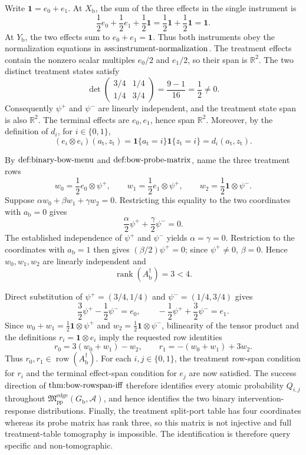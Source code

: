 Write \(\mathbf 1=e_0+e_1\).  At \(X_{\mathrm b}\), the sum of the three effects in the single instrument is
\[
 \frac12e_0+\frac12e_1+\frac12\mathbf 1
 =\frac12\mathbf 1+\frac12\mathbf 1
 =\mathbf 1.
\]
At \(Y_{\mathrm b}\), the two effects sum to \(e_0+e_1=\mathbf 1\).  Thus both instruments obey the normalization equations in \(\textnormal{ass:instrument-normalization}\).  The treatment effects contain the nonzero scalar multiples \(e_0/2\) and \(e_1/2\), so their span is \(\mathbb R^2\).  The two distinct treatment states satisfy
\[
 \det\!\begin{pmatrix}3/4&1/4\\[2pt]1/4&3/4\end{pmatrix}
 =\frac{9-1}{16}=\frac12\ne0.
\]
Consequently \(\psi^+\) and \(\psi^-\) are linearly independent, and the treatment state span is also \(\mathbb R^2\).  The terminal effects are \(e_0,e_1\), hence span \(\mathbb R^2\).  Moreover, by the definition of \(d_i\), for \(i\in\{0,1\}\),
\[
 (e_i\otimes e_i)(a_{\mathrm t},z_{\mathrm t})
 =\mathbf 1\{a_{\mathrm t}=i\}\mathbf 1\{z_{\mathrm t}=i\}
 =d_i(a_{\mathrm t},z_{\mathrm t}).
\]

By \(\textnormal{def:binary-bow-menu}\) and \(\textnormal{def:bow-probe-matrix}\), name the three treatment rows
\[
 w_0=\frac12e_0\otimes\psi^+,
 \qquad
 w_1=\frac12e_1\otimes\psi^+,
 \qquad
 w_2=\frac12\mathbf 1\otimes\psi^-.
\]
Suppose \(\alpha w_0+\beta w_1+\gamma w_2=0\).  Restricting this equality to the two coordinates with \(a_{\mathrm b}=0\) gives
\[
 \frac{\alpha}{2}\psi^++\frac{\gamma}{2}\psi^-=0.
\]
The established independence of \(\psi^+\) and \(\psi^-\) yields \(\alpha=\gamma=0\).  Restriction to the coordinates with \(a_{\mathrm b}=1\) then gives \((\beta/2)\psi^+=0\); since \(\psi^+\ne0\), \(\beta=0\).  Hence \(w_0,w_1,w_2\) are linearly independent and
\[
 \operatorname{rank}(A_{\mathrm b}^{\dagger})=3<4.
\]

Direct substitution of \(\psi^+=(3/4,1/4)\) and \(\psi^-=(1/4,3/4)\) gives
\[
 \frac32\psi^+-\frac12\psi^-=e_0,
 \qquad
 -\frac12\psi^++\frac32\psi^-=e_1.
\]
Since \(w_0+w_1=\tfrac12\mathbf 1\otimes\psi^+\) and \(w_2=\tfrac12\mathbf 1\otimes\psi^-\), bilinearity of the tensor product and the definitions \(r_i=\mathbf 1\otimes e_i\) imply the requested row identities
\[
 r_0=3(w_0+w_1)-w_2,
 \qquad
 r_1=-(w_0+w_1)+3w_2.
\]
Thus \(r_0,r_1\in\operatorname{row}(A_{\mathrm b}^{\dagger})\).  For each \(i,j\in\{0,1\}\), the treatment row-span condition for \(r_i\) and the terminal effect-span condition for \(e_j\) are now satisfied.  The success direction of \(\textnormal{thm:bow-rowspan-iff}\) therefore identifies every atomic probability \(Q_{i,j}\) throughout \(\mathfrak M_{\mathrm{pp}}^{\mathrm{edge}}(G_{\mathrm b},\mathcal A)\), and hence identifies the two binary intervention-response distributions.  Finally, the treatment split-port table has four coordinates whereas its probe matrix has rank three, so this matrix is not injective and full treatment-table tomography is impossible.  The identification is therefore query specific and non-tomographic.